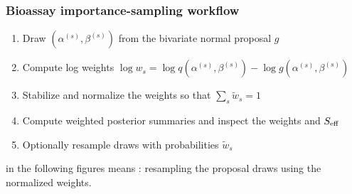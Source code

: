 \documentclass[10pt]{beamer}
\begin{document}
\begin{frame}
\frametitle{Bioassay importance-sampling workflow}

  \begin{enumerate}
    \item Draw $(\alpha^{(s)},\beta^{(s)})$ from the bivariate normal
      proposal $g$
    \item Compute log weights
      $\log w_s=\log q(\alpha^{(s)},\beta^{(s)})-
      \log g(\alpha^{(s)},\beta^{(s)})$
    \item Stabilize and normalize the weights so that
      $\sum_s\widetilde w_s=1$
    \item Compute weighted posterior summaries and inspect the weights
      and $S_{\rm eff}$
    \item Optionally resample draws with probabilities $\widetilde w_s$
  \end{enumerate}

  \pause
   in the following figures means :
  resampling the proposal draws using the normalized weights.

\end{frame}
\end{document}
